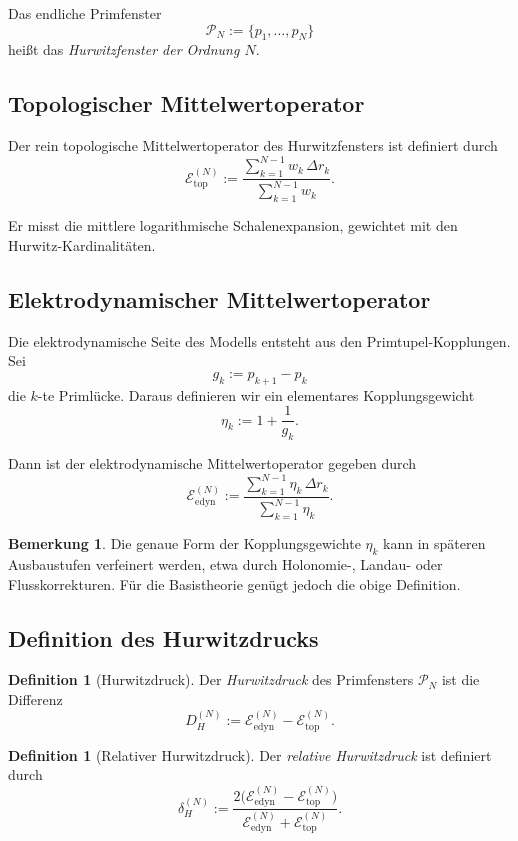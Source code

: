 \documentclass[12pt,a4paper]{article}
\theoremstyle{definition}
\newtheorem{definition}[satz]{Definition}
\newtheorem{bemerkung}[satz]{Bemerkung}
\begin{document}
	Das endliche Primfenster
	\[
	\mathcal{P}_N:=\{p_1,\dots,p_N\}
	\]
	heißt das \emph{Hurwitzfenster der Ordnung \(N\)}.
	
	\subsection{Topologischer Mittelwertoperator}
	
	Der rein topologische Mittelwertoperator des Hurwitzfensters ist definiert durch
	\[
	\mathcal{E}_{\mathrm{top}}^{(N)}
	:=
	\frac{\sum_{k=1}^{N-1} w_k\,\Delta r_k}
	{\sum_{k=1}^{N-1} w_k}.
	\]
	
	Er misst die mittlere logarithmische Schalenexpansion, gewichtet mit den Hurwitz-Kardinalitäten.
	
	\subsection{Elektrodynamischer Mittelwertoperator}
	
	Die elektrodynamische Seite des Modells entsteht aus den Primtupel-Kopplungen. Sei
	\[
	g_k:=p_{k+1}-p_k
	\]
	die \(k\)-te Primlücke. Daraus definieren wir ein elementares Kopplungsgewicht
	\[
	\eta_k:=1+\frac{1}{g_k}.
	\]
	
	Dann ist der elektrodynamische Mittelwertoperator gegeben durch
	\[
	\mathcal{E}_{\mathrm{edyn}}^{(N)}
	:=
	\frac{\sum_{k=1}^{N-1} \eta_k\,\Delta r_k}
	{\sum_{k=1}^{N-1} \eta_k}.
	\]
	
	\begin{bemerkung}
		Die genaue Form der Kopplungsgewichte \(\eta_k\) kann in späteren Ausbaustufen verfeinert werden, etwa durch Holonomie-, Landau- oder Flusskorrekturen. Für die Basistheorie genügt jedoch die obige Definition.
	\end{bemerkung}
	
	\subsection{Definition des Hurwitzdrucks}
	
	\begin{definition}[Hurwitzdruck]
		Der \emph{Hurwitzdruck} des Primfensters \(\mathcal{P}_N\) ist die Differenz
		\[
		D_H^{(N)}
		:=
		\mathcal{E}_{\mathrm{edyn}}^{(N)}
		-
		\mathcal{E}_{\mathrm{top}}^{(N)}.
		\]
	\end{definition}
	
	\begin{definition}[Relativer Hurwitzdruck]
		Der \emph{relative Hurwitzdruck} ist definiert durch
		\[
		\delta_H^{(N)}
		:=
		\frac{2\bigl(\mathcal{E}_{\mathrm{edyn}}^{(N)}-\mathcal{E}_{\mathrm{top}}^{(N)}\bigr)}
		{\mathcal{E}_{\mathrm{edyn}}^{(N)}+\mathcal{E}_{\mathrm{top}}^{(N)}}.
		\]
	\end{definition}
	
\end{document}
